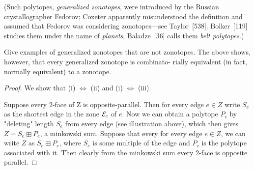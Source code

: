 \documentclass{article}
\begin{document}
\begin{enumerate}
(Such polytopes, \emph{generalized zonotopes}, were introduced by the Russian crystallographer Fedorov; Coxeter apparently misunderstood the definition and assumed that Fedorov was considering zonotopes---see Taylor~[538]. Bolker~[119] studies them under the name of \emph{planets}, Baladze~[36] calls them \emph{belt polytopes}.)

Give examples of generalized zonotopes that are not zonotopes. The
above shows, however, that every generalized zonotope is combinato-
rially equivalent (in fact, normally equivalent) to a zonotope.

\begin{figure}[h]
    \centering
{}
\end{figure}

\begin{proof}
We show that (i) $\iff$ (ii) and (i) $\iff$ (iii).

Suppose every 2-face of Z is opposite-parallel. Then for every edge $e \in Z$ write $S_e$ as the shortest edge in the zone $\mathcal{E}_e$ of $e$. Now we can obtain a polytope $P_e$ by "deleting" length $S_e$ from every edge (see illustration above), which then gives $Z = S_e \boxplus P_e$, a minkowski sum. Suppose that every for every edge $e \in Z$, we can write $Z$ as $S_e \boxplus P_e$, where $S_e$ is some multiple of the edge and $P_e$ is the polytope associated with it. Then clearly from the minkowski sum every 2-face is opposite parallel.


\end{proof}
\end{enumerate}
\end{document}

